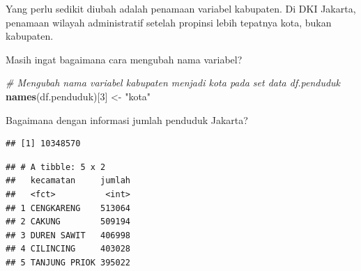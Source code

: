\documentclass[openany]{book}
\newenvironment{Shaded}{\begin{snugshade}}{\end{snugshade}}
\newcommand{\KeywordTok}[1]{\textcolor[rgb]{0.13,0.29,0.53}{\textbf{#1}}}
\newcommand{\DataTypeTok}[1]{\textcolor[rgb]{0.13,0.29,0.53}{#1}}
\newcommand{\DecValTok}[1]{\textcolor[rgb]{0.00,0.00,0.81}{#1}}
\newcommand{\StringTok}[1]{\textcolor[rgb]{0.31,0.60,0.02}{#1}}
\newcommand{\CommentTok}[1]{\textcolor[rgb]{0.56,0.35,0.01}{\textit{#1}}}
\newcommand{\OperatorTok}[1]{\textcolor[rgb]{0.81,0.36,0.00}{\textbf{#1}}}
\newcommand{\NormalTok}[1]{#1}
\begin{document}
Yang perlu sedikit diubah adalah penamaan variabel kabupaten. Di DKI
Jakarta, penamaan wilayah administratif setelah propinsi lebih tepatnya
kota, bukan kabupaten.

Masih ingat bagaimana cara mengubah nama variabel?

\begin{Shaded}
\begin{Highlighting}[]
\CommentTok{# Mengubah nama variabel kabupaten menjadi kota pada set data df.penduduk}
\KeywordTok{names}\NormalTok{(df.penduduk)[}\DecValTok{3}\NormalTok{] <-}\StringTok{ "kota"}
\end{Highlighting}
\end{Shaded}

Bagaimana dengan informasi jumlah penduduk Jakarta?

\begin{Shaded}
\end{Shaded}

\begin{verbatim}
## [1] 10348570
\end{verbatim}

\begin{Shaded}
\end{Shaded}

\begin{verbatim}
## # A tibble: 5 x 2
##   kecamatan     jumlah
##   <fct>          <int>
## 1 CENGKARENG    513064
## 2 CAKUNG        509194
## 3 DUREN SAWIT   406998
## 4 CILINCING     403028
## 5 TANJUNG PRIOK 395022
\end{verbatim}
\end{document}
